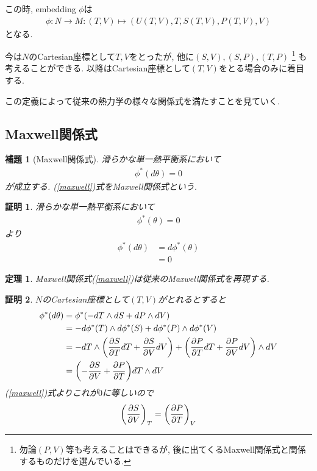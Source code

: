 \documentclass[a4paper,12pt]{ltjsarticle}
\theoremstyle{break}
\newtheorem{thrm}[thm]{定理}
\newtheorem{lem}[thm]{補題}
\newtheorem*{prf}{証明}
\newcommand{\mt}{\mapsto}
\newcommand{\ddel}[2]{\frac{\partial{#1}}{\partial{#2}}}
\numberwithin{equation}{section}
\begin{document}
この時, embedding $\phi$は
\begin{align*}
  \phi: N \to M: (T,V) \mt (U(T,V), T, S(T,V), P(T,V), V)
\end{align*}
となる. 

今は$N$のCartesian座標として$T,V$をとったが, 他に$(S,V), (S,P), (T,P)$ 
\footnote{
  勿論$(P,V)$等も考えることはできるが, 後に出てくるMaxwell関係式と関係するものだけを選んでいる. 
}
も考えることができる. 
以降はCartesian座標として$(T,V)$をとる場合のみに着目する.

この定義によって従来の熱力学の様々な関係式を満たすことを見ていく. 

\subsection{Maxwell関係式}

\begin{lem}[Maxwell関係式]
  滑らかな単一熱平衡系において
  \begin{align}
    \label{maxwell}
    \phi^*(d\theta)
    = 0
  \end{align}
  が成立する.  
  (\ref{maxwell})式をMaxwell関係式という.
\end{lem}  

\begin{prf}
  滑らかな単一熱平衡系において
  \begin{align*}
    \phi^*(\theta)
    = 0
  \end{align*}
  より
  \begin{align*}
    \phi^*(d\theta) 
    &= d \phi^*(\theta) \\
    &= 0
  \end{align*}
\end{prf}

\begin{thrm}
  Maxwell関係式(\ref{maxwell})は従来のMaxwell関係式を再現する. 
\end{thrm}

\begin{prf}
  $N$のCartesian座標として$(T,V)$がとれるとすると
  \begin{align*}
    \phi^*(d\theta) 
    &= \phi^*(-dT \wedge dS + dP \wedge dV) \\
    &= -d\phi^*(T) \wedge d\phi^*(S) + d\phi^*(P) \wedge d\phi^*(V) \\
    &= -dT \wedge \qty(\ddel{S}{T} dT + \ddel{S}{V} dV) + \qty(\ddel{P}{T} dT + \ddel{P}{V} dV) \wedge dV \\
    &= \qty(-\ddel{S}{V} + \ddel{P}{T}) dT \wedge dV \\
  \end{align*}
  (\ref{maxwell})式よりこれが$0$に等しいので
  \begin{align}
    \label{maxwell1}
    \qty(\ddel{S}{V})_T 
    = \qty(\ddel{P}{T})_V
  \end{align}
\end{prf}
\end{document}
